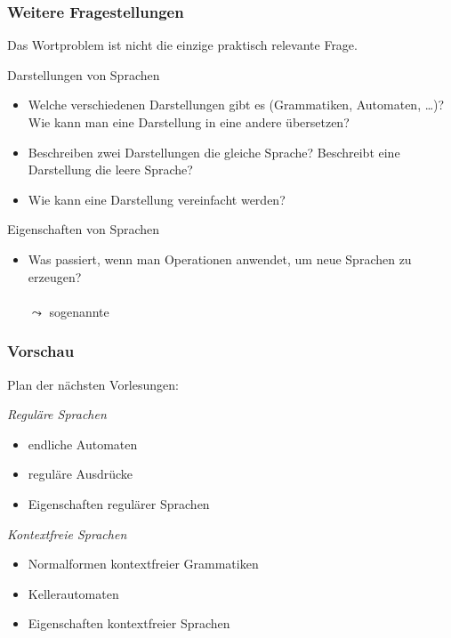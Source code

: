 \documentclass[aspectratio=1610,onlymath]{beamer}
\begin{document}
\begin{frame}\frametitle{Weitere Fragestellungen}

Das Wortproblem ist nicht die einzige praktisch relevante Frage.
\medskip

\alert{Darstellungen von Sprachen}
\begin{itemize}
\item Welche verschiedenen Darstellungen gibt es (Grammatiken, Automaten, \ldots)? Wie kann man eine Darstellung in eine andere übersetzen?
\item Beschreiben zwei Darstellungen die gleiche Sprache? Beschreibt eine Darstellung die leere Sprache?
\item Wie kann eine Darstellung vereinfacht werden?
\end{itemize}

\alert{Eigenschaften von Sprachen}
\begin{itemize}
\item Was passiert, wenn man Operationen anwendet, um neue Sprachen zu erzeugen?\\[1ex]
\\[0.5ex]
$\leadsto$ sogenannte 
\end{itemize}

\end{frame}

\begin{frame}\frametitle{Vorschau}

Plan der nächsten Vorlesungen:
\medskip

\emph{Reguläre Sprachen}
\begin{itemize}
\item endliche Automaten
\item reguläre Ausdrücke
\item Eigenschaften regulärer Sprachen
\end{itemize}

\emph{Kontextfreie Sprachen}
\begin{itemize}
\item Normalformen kontextfreier Grammatiken
\item Kellerautomaten
\item Eigenschaften kontextfreier Sprachen
\end{itemize}

\end{frame}
\end{document}
